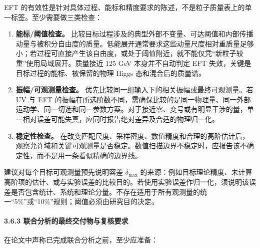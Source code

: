 \documentclass[
]{article}
\providecommand{\tightlist}{%
  \setlength{\itemsep}{0pt}\setlength{\parskip}{0pt}}
\begin{document}
EFT
的有效性是针对具体过程、能标和精度要求的陈述，不是粒子质量表上的单一标签。至少需要做三类检查：

\begin{enumerate}
\def\labelenumi{\arabic{enumi}.}
\tightlist
\item
  \textbf{能标/阈值检查。}
  比较目标过程涉及的典型外部不变量、可达阈值和内部传播动量与被积分自由度的质量。低能展开通常要求这些动量尺度相对重质量足够小；若过程可直接产生该自由度，或处于阈值附近，就不能仅凭``新粒子较重''使用局域展开。质量接近
  125 GeV 本身并不自动判定 EFT 失效，关键是目标过程的能标、被保留的物理
  Higgs 态和混合后的质量谱。
\item
  \textbf{振幅/可观测量检查。}
  优先比较同一组输入下的相关振幅或最终可观测量。若 UV 与 EFT
  的振幅在所选阶数不同，需确保比较的是同一物理量、同一外部运动学、同一切选和同一参数方案。对于接近零、变号或有明显干涉的量，单一相对误差可能失真，应同时报告绝对差异及合适的物理归一化。
\item
  \textbf{稳定性检查。}
  在改变匹配尺度、采样密度、数值精度和合理的高阶估计后，观察允许域和关键可观测量是否稳定。数值扫描边界不稳定时，应报告该不确定性，而不是用一条看似精确的边界线。
\end{enumerate}

建议对每个目标可观测量预先说明容差 \(\delta_{\max}\)
的来源：例如目标理论精度、未计算高阶项的估计、或与实验误差的比较目的。若使用实验误差作归一化，须说明该误差是否包含统计、系统和理论分量。不存在适用于所有观测量的统一``5\%''或``10\%''规则；阈值必须由研究目的决定。

\paragraph{3.6.3
联合分析的最终交付物与复核要求}\label{ux8054ux5408ux5206ux6790ux7684ux6700ux7ec8ux4ea4ux4ed8ux7269ux4e0eux590dux6838ux8981ux6c42}

在论文中声称已完成联合分析之前，至少应准备：
\end{document}

